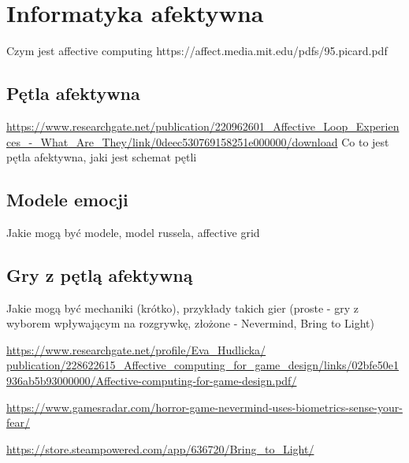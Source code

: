 \chapter{Informatyka afektywna}
\label{cha:affectiveComputing}
Czym jest affective computing
https://affect.media.mit.edu/pdfs/95.picard.pdf
\section{Pętla afektywna}
\url{https://www.researchgate.net/publication/220962601_Affective_Loop_Experiences_-_What_Are_They/link/0deec530769158251e000000/download}
Co to jest pętla afektywna, jaki jest schemat pętli

\section{Modele emocji}
Jakie mogą być modele, model russela, affective grid



\section{Gry z pętlą afektywną}
Jakie mogą być mechaniki (krótko), przykłady takich gier (proste - gry z wyborem wpływającym na rozgrywkę, złożone - Nevermind, Bring to Light)

\url{https://www.researchgate.net/profile/Eva_Hudlicka/ publication/228622615_Affective_computing_for_game_design/links/02bfe50e1936ab5b93000000/Affective-computing-for-game-design.pdf/}

\url{https://www.gamesradar.com/horror-game-nevermind-uses-biometrics-sense-your-fear/}

\url{https://store.steampowered.com/app/636720/Bring_to_Light/}


